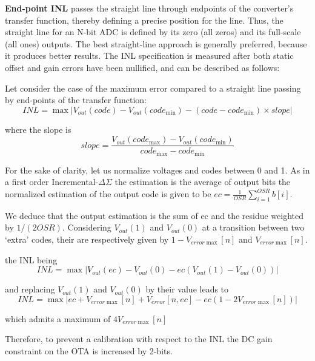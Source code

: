 \textbf{End-point INL} passes the straight line through endpoints of the converter's transfer function, thereby defining a precise position for the line. Thus, the straight line for an N-bit ADC is defined by its zero (all zeros) and its full-scale (all ones) outputs.
The best straight-line approach is generally preferred, because it produces better results. The INL specification is measured after both static offset and gain errors have been nullified, and can be described as follows:

Let consider the case of the maximum error compared to a straight line passing by end-points of the transfer function:
\begin{equation}
    INL = \max \left| V_{out}(code)-V_{out}(code_{\min}) - (code-code_{\min}) \times slope  \right|
\end{equation}

where the slope is 
\begin{equation}
    slope = \frac{V_{out}(code_{\max})-V_{out}(code_{\min})}{code_{\max}-code_{\min}}
\end{equation}

For the sake of clarity, let us normalize voltages and codes between 0 and 1. As in a first order Incremental-\(\Delta\Sigma \) the estimation is the average of output bits the normalized estimation of the output code is given to be \(ec = \frac{1}{OSR}\sum_{i=1}^{OSR} b[i] \). 

We deduce that the output estimation is the sum of ec and the residue weighted by \(1/(2 OSR)\).  Considering \(V_{out}(1) \) and \(V_{out}(0) \) at a transition between two `extra' codes, their are respectively given by \(1-V_{error\max}[n] \) and \(V_{error\max}[n] \).

the INL being
\begin{equation}
    INL = \max \left| V_{out}(ec)-V_{out}(0) - ec (V_{out}(1)-V_{out}(0))  \right|
\end{equation}

and replacing \(V_{out}(1) \) and \(V_{out}(0)\) by their value leads to
\begin{equation}
    INL = \max \left| ec + V_{error\max } [n] + V_{error}[n, ec] - ec (1 - 2 V_{error\max }[n])  \right|
\end{equation}

which admits a maximum of \(4 V_{error\max }[n] \)

Therefore, to prevent a calibration with respect to the INL the DC gain constraint on the OTA is increased by 2-bits.
